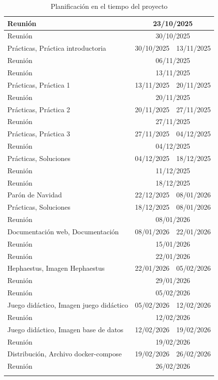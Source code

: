 {\begin{longtable}[c]{|l|cc|}
	Reunión & \multicolumn{2}{c|}{23/10/2025} \\ \hline
	Reunión & \multicolumn{2}{c|}{30/10/2025} \\ \hline
	Prácticas, Práctica introductoria & \multicolumn{1}{c|}{30/10/2025} & 13/11/2025 \\ \hline
	Reunión & \multicolumn{2}{c|}{06/11/2025} \\ \hline
	Reunión & \multicolumn{2}{c|}{13/11/2025} \\ \hline
	Prácticas, Práctica 1 & \multicolumn{1}{c|}{13/11/2025} & 20/11/2025 \\ \hline
	Reunión & \multicolumn{2}{c|}{20/11/2025} \\ \hline
	Prácticas, Práctica 2 & \multicolumn{1}{c|}{20/11/2025} & 27/11/2025 \\ \hline
	Reunión & \multicolumn{2}{c|}{27/11/2025} \\ \hline
	Prácticas, Práctica 3 & \multicolumn{1}{c|}{27/11/2025} & 04/12/2025 \\ \hline
	Reunión & \multicolumn{2}{c|}{04/12/2025} \\ \hline
	Prácticas, Soluciones & \multicolumn{1}{c|}{04/12/2025} & 18/12/2025 \\ \hline
	Reunión & \multicolumn{2}{c|}{11/12/2025} \\ \hline
	Reunión & \multicolumn{2}{c|}{18/12/2025} \\ \hline
	Parón de Navidad & \multicolumn{1}{c|}{22/12/2025} & 08/01/2026 \\ \hline
	Prácticas, Soluciones & \multicolumn{1}{c|}{18/12/2025} & 08/01/2026 \\ \hline
	Reunión & \multicolumn{2}{c|}{08/01/2026} \\ \hline
	Documentación web, Documentación & \multicolumn{1}{c|}{08/01/2026} & 22/01/2026 \\ \hline
	Reunión & \multicolumn{2}{c|}{15/01/2026} \\ \hline
	Reunión & \multicolumn{2}{c|}{22/01/2026} \\ \hline
	Hephaestus, Imagen Hephaestus & \multicolumn{1}{c|}{22/01/2026} & 05/02/2026 \\ \hline
	Reunión & \multicolumn{2}{c|}{29/01/2026} \\ \hline
	Reunión & \multicolumn{2}{c|}{05/02/2026} \\ \hline
	Juego didáctico, Imagen juego didáctico & \multicolumn{1}{c|}{05/02/2026} & 12/02/2026 \\ \hline
	Reunión & \multicolumn{2}{c|}{12/02/2026} \\ \hline
	Juego didáctico, Imagen base de datos & \multicolumn{1}{c|}{12/02/2026} & 19/02/2026 \\ \hline
	Reunión & \multicolumn{2}{c|}{19/02/2026} \\ \hline
	Distribución, Archivo docker-compose & \multicolumn{1}{c|}{19/02/2026} & 26/02/2026 \\ \hline
	Reunión & \multicolumn{2}{c|}{26/02/2026} \\ \hline
	\caption{Planificación en el tiempo del proyecto}
	\label{tab:sprints}
\end{longtable}
}